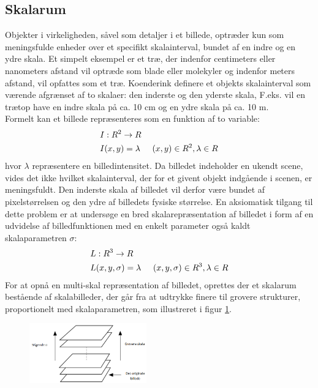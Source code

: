 \subsection{Skalarum}
Objekter i virkeligheden, såvel som detaljer i et billede, optræder kun som meningsfulde enheder over et specifikt skalainterval, bundet af en indre og en ydre skala. Et simpelt eksempel er et træ, der indenfor centimeters eller nanometers afstand vil optræde som blade eller molekyler og indenfor meters afstand, vil opfattes som et træ. Koenderink \cite{koen} definere et objekts skalainterval som værende afgrænset af to skalaer: den inderste og den yderste skala,  F.eks. vil en trætop have en indre skala på ca. 10 cm og en ydre skala på ca. 10 m. 
\\
Formelt kan et billede repræsenteres som en funktion af to variable:
\begin{equation}
\begin{split}
&I: R^2 \rightarrow R \\
&I(x,y) = \lambda \hspace{0.5 cm} (x,y)\in R^2, \lambda \in R
\end{split}
\end{equation}
hvor $\lambda$ repræsentere en billedintensitet. Da billedet indeholder en ukendt scene, vides det ikke hvilket skalainterval, der for et givent objekt indgående i scenen, er meningsfuldt. Den inderste skala af billedet vil derfor være bundet af pixelstørrelsen og den ydre af billedets fysiske størrelse. En aksiomatisk tilgang til dette problem er at undersøge en bred skalarepræsentation af billedet i form af en udvidelse af billedfunktionen med en enkelt parameter også kaldt skalaparametren $\sigma$:
\begin{equation}
\begin{split}
&L: R^3 \rightarrow R \\
&L(x,y,\sigma) = \lambda \hspace{0.5 cm} (x,y,\sigma)\in R^3, \lambda \in R
\end{split}
\end{equation}
For at opnå en multi-skal repræsentation af billedet, oprettes der et skalarum bestående af skalabilleder, der går fra at udtrykke finere til grovere strukturer, proportionelt med skalaparametren, som illustreret i figur \ref{fig:scalerep}. 
\begin{figure}[H]
    \centering
    \includegraphics[width=0.45\textwidth]{fig/32.png}
     \vspace{-1em}
    \begin{center}    
       \caption{\textcolor{gray}{\footnotesize \textit{ }}}
    \label{fig:scalerep}
     \end{center}
     \vspace{-2.5em}
  \end{figure} \noindent
